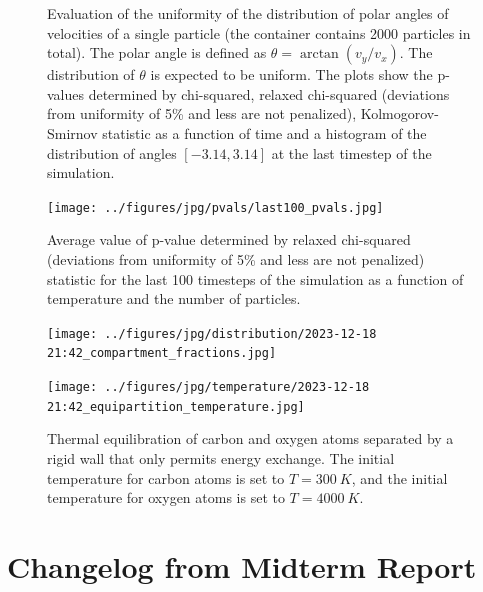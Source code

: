 \documentclass[10pt]{article}
\begin{document}
\begin{figure}[H]
\begin{minipage}{0.9\linewidth}
    \end{minipage}
    \caption{Evaluation of the uniformity of the distribution of polar angles of velocities of a single particle (the container contains 2000 particles in total). The polar angle is defined as $\theta=\arctan(v_y/v_x)$. The distribution of $\theta$ is expected to be uniform. The plots show the p-values determined by chi-squared, relaxed chi-squared (deviations from uniformity of 5\% and less are not penalized), Kolmogorov-Smirnov statistic as a function of time and a histogram of the distribution of angles $[-3.14, 3.14]$ at the last timestep of the simulation.}
    \label{fig:uniformity_confidence}
\end{figure}

\newpage

\begin{figure}[h]
    \centering
    \texttt{[image: ../figures/jpg/pvals/last100\_pvals.jpg]}
    \caption{Average value of p-value determined by relaxed chi-squared (deviations from uniformity of 5\% and less are not penalized) statistic for the last 100 timesteps of the simulation as a function of temperature and the number of particles.}
    \label{fig:uniformity_summary}
\end{figure}


\begin{figure}[h]
    \centering
    \begin{minipage}{0.49\linewidth}
        \texttt{[image: ../figures/jpg/distribution/2023-12-18 21:42\_compartment\_fractions.jpg]}
    \end{minipage} 
    \begin{minipage}{0.49\linewidth}
        \texttt{[image: ../figures/jpg/temperature/2023-12-18 21:42\_equipartition\_temperature.jpg]}
    \end{minipage} 
    \caption{Thermal equilibration of carbon and oxygen atoms separated by a rigid wall that only permits energy exchange. The initial temperature for carbon atoms is set to $T=\qty{300}{K}$, and the initial temperature for oxygen atoms is set to $T=\qty{4000}{K}$.}
    \label{fig:rigid_wall}
\end{figure}



\section{Changelog from Midterm Report}
\label{sec:changelog}
\end{document}
